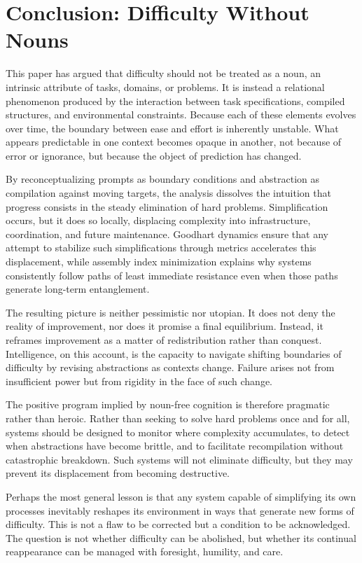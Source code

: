 \documentclass[12pt]{article}
\begin{document}
\section{Conclusion: Difficulty Without Nouns}

This paper has argued that difficulty should not be treated as a noun, an intrinsic attribute of tasks, domains, or problems. It is instead a relational phenomenon produced by the interaction between task specifications, compiled structures, and environmental constraints. Because each of these elements evolves over time, the boundary between ease and effort is inherently unstable. What appears predictable in one context becomes opaque in another, not because of error or ignorance, but because the object of prediction has changed.

By reconceptualizing prompts as boundary conditions and abstraction as compilation against moving targets, the analysis dissolves the intuition that progress consists in the steady elimination of hard problems. Simplification occurs, but it does so locally, displacing complexity into infrastructure, coordination, and future maintenance. Goodhart dynamics ensure that any attempt to stabilize such simplifications through metrics accelerates this displacement, while assembly index minimization explains why systems consistently follow paths of least immediate resistance even when those paths generate long-term entanglement.

The resulting picture is neither pessimistic nor utopian. It does not deny the reality of improvement, nor does it promise a final equilibrium. Instead, it reframes improvement as a matter of redistribution rather than conquest. Intelligence, on this account, is the capacity to navigate shifting boundaries of difficulty by revising abstractions as contexts change. Failure arises not from insufficient power but from rigidity in the face of such change.

The positive program implied by noun-free cognition is therefore pragmatic rather than heroic. Rather than seeking to solve hard problems once and for all, systems should be designed to monitor where complexity accumulates, to detect when abstractions have become brittle, and to facilitate recompilation without catastrophic breakdown. Such systems will not eliminate difficulty, but they may prevent its displacement from becoming destructive.

Perhaps the most general lesson is that any system capable of simplifying its own processes inevitably reshapes its environment in ways that generate new forms of difficulty. This is not a flaw to be corrected but a condition to be acknowledged. The question is not whether difficulty can be abolished, but whether its continual reappearance can be managed with foresight, humility, and care.
\end{document}
